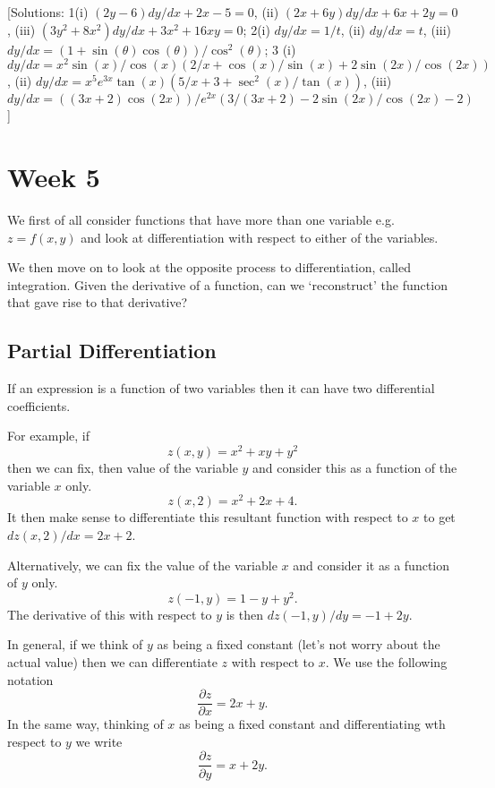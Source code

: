 \documentclass[
  11pt,
  oneside]{book}
\newcommand{\slide}{}
\theoremstyle{definition}
\theoremstyle{definition}
\theoremstyle{definition}
\theoremstyle{definition}
\theoremstyle{remark}
\begin{document}
{[}Solutions: 1(i) \((2y-6)dy/dx+2x-5=0\), (ii) \((2x+6y)dy/dx+6x+2y=0\), (iii) \((3y^2+8x^2)dy/dx+3x^2+16xy=0\); 2(i) \(dy/dx = 1/t\), (ii) \(dy/dx = t\), (iii) \(dy/dx = (1+\sin(\theta)\cos(\theta))/\cos^2(\theta)\); 3 (i) \(dy/dx=x^2\sin(x)/\cos(x)\left(2/x+\cos(x)/\sin(x)+2\sin(2x)/\cos(2x)\right)\), (ii) \(dy/dx = x^5e^{3x}\tan(x)\left(5/x+3+\sec^2(x)/\tan(x)\right)\), (iii) \(dy/dx = ((3x+2)\cos(2x))/e^{2x}\left(3/(3x+2)-2\sin(2x)/\cos(2x)-2\right)\){]}

\chapter{Week 5}\label{week-five}

We first of all consider functions that have more than one variable e.g.~\(z = f(x,y)\) and look at differentiation with respect to either of the variables.

We then move on to look at the opposite process to differentiation, called integration. Given the derivative of a function, can we `reconstruct' the function that gave rise to that derivative?

\slide

\section{Partial Differentiation}\label{partial-differentiation}

If an expression is a function of two variables then it can have two differential coefficients.

For example, if
\[
z(x,y) = x^2+xy+y^2
\]
then we can fix, then value of the variable \(y\) and consider this as a function of the variable \(x\) only.
\[
z(x,2) = x^2 + 2x + 4.
\]
It then make sense to differentiate this resultant function with respect to \(x\) to get \(dz(x,2)/dx = 2x+2\).

Alternatively, we can fix the value of the variable \(x\) and consider it as a function of \(y\) only.
\[
z(-1,y) = 1-y+y^2.
\]
The derivative of this with respect to \(y\) is then \(dz(-1,y)/dy = -1+2y\).

\slide

In general, if we think of \(y\) as being a fixed constant (let's not worry about the actual value) then we can differentiate \(z\) with respect to \(x\). We use the following notation
\[
\frac{\partial z}{\partial x} = 2x+y.
\]
In the same way, thinking of \(x\) as being a fixed constant and differentiating wth respect to \(y\) we write
\[
\frac{\partial z}{\partial y} = x + 2y.
\]
\end{document}
